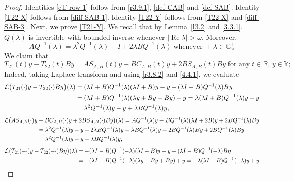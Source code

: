 \documentclass[11pt]{amsart}
\numberwithin{equation}{section}
\newcommand{\SAB}{S_{A,B}}
\theoremstyle{remark}
\theoremstyle{definition}
\newcommand\bY{{\mathbb Y}}
\begin{document}
\begin{proof}
Identities \eqref{cT-row 1}	 follow from \eqref{r3.9.1}, \eqref{def-CAB} and \eqref{def-SAB}. Identity \eqref{T22-X}
follows from \eqref{diff-SAB-1}. Identity \eqref{T22-Y} follows from \eqref{T22-X} and \eqref{diff-SAB-3}. Next, we prove \eqref{T21-Y}. We recall that by Lemma~\ref{l3.2} and \eqref{3.3.1}, $Q(\lambda)$ is invertible with bounded inverse whenever $|\operatorname{Re}\lambda| > \omega$.
	Moreover,
	\begin{equation}\label{4.4.1}
		AQ^{-1}(\lambda) = \lambda^2 Q^{-1}(\lambda) - I + 2\lambda BQ^{-1}(\lambda)\;\mbox{whenever}\; \pm\lambda \in \mathbb{C}_\omega^+
	\end{equation}
	We claim that 
	\begin{equation}\label{4.4.2}
		T_{21}(t)y - T_{22}(t)By = A\SAB(t)y - BC_{A,B}(t)y + 2B\SAB(t)By\; \text{for any}\; t \in \mathbb{R},\, y \in \bY;
	\end{equation}
	Indeed, taking Laplace transform and using \eqref{r3.8.2} and \eqref{4.4.1}, we evaluate 
	\begin{align}\label{4.4.3}
		\mathcal{L}\big(T_{21}(\cdot)y - T_{22}(\cdot)By\big)(\lambda)
		&= (\lambda I+B)Q^{-1}(\lambda)(\lambda I+B)y - y - (\lambda I+B)Q^{-1}(\lambda)By \notag\\
		&= (\lambda I+B)Q^{-1}(\lambda)(\lambda y + By - By) - y
		= \lambda(\lambda I+B)Q^{-1}(\lambda)y - y \notag\\
		&= \lambda^2 Q^{-1}(\lambda)y - y + \lambda BQ^{-1}(\lambda)y,
	\end{align}
	\begin{align}\label{4.4.4}
		\mathcal{L}\big(A\SAB(\cdot)y &- BC_{A,B}(\cdot)y + 2B\SAB(\cdot)By\big)(\lambda)
		= AQ^{-1}(\lambda)y - BQ^{-1}(\lambda)(\lambda I+2B)y + 2BQ^{-1}(\lambda)By \notag\\
		&= \lambda^2 Q^{-1}(\lambda)y - y + 2\lambda BQ^{-1}(\lambda)y - \lambda BQ^{-1}(\lambda)y
		- 2BQ^{-1}(\lambda)By + 2BQ^{-1}(\lambda)By \notag\\
		&= \lambda^2 Q^{-1}(\lambda)y - y + \lambda BQ^{-1}(\lambda)y, 
	\end{align}
	\begin{align}\label{4.4.5}
		\mathcal{L}\big(T_{21}(-\cdot)y - T_{22}(-\cdot)By\big)(\lambda)
		&= -(\lambda I-B)Q^{-1}(-\lambda)(\lambda I-B)y + y + (\lambda I-B)Q^{-1}(-\lambda)By \notag\\
		&= -(\lambda I-B)Q^{-1}(-\lambda)(\lambda y - By + By) + y
		= -\lambda(\lambda I-B)Q^{-1}(-\lambda)y + y \notag\\

\end{align}
\end{proof}
\end{document}
